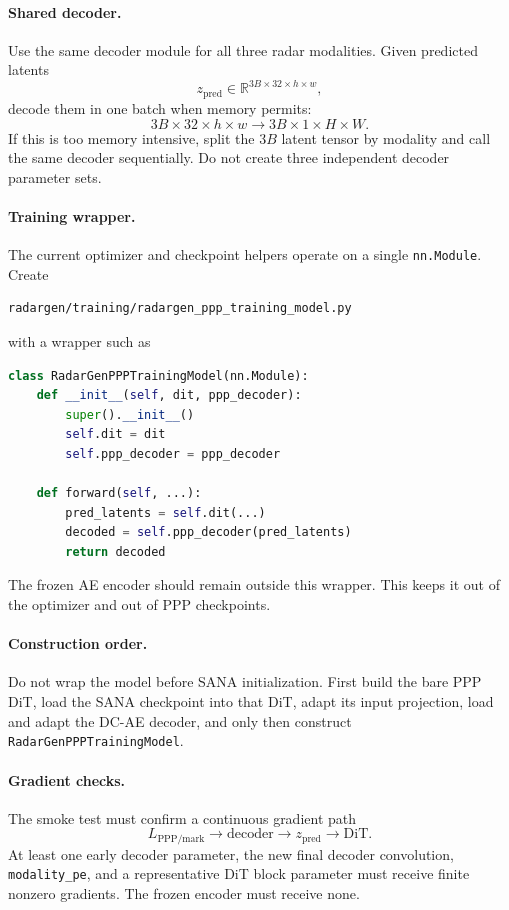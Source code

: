 \documentclass[11pt,a4paper]{article}
\begin{document}
\paragraph{Shared decoder.}
Use the same decoder module for all three radar modalities. Given predicted latents
\[
    z_{\mathrm{pred}}
    \in
    \mathbb R^{3B\times32\times h\times w},
\]
decode them in one batch when memory permits:
\[
    3B\times32\times h\times w
    \longrightarrow
    3B\times1\times H\times W.
\]
If this is too memory intensive, split the \(3B\) latent tensor by modality and call the same decoder sequentially. Do not create three independent decoder parameter sets.

\paragraph{Training wrapper.}
The current optimizer and checkpoint helpers operate on a single \texttt{nn.Module}. Create
\begin{lstlisting}
radargen/training/radargen_ppp_training_model.py
\end{lstlisting}
with a wrapper such as
\begin{lstlisting}[language=Python]
class RadarGenPPPTrainingModel(nn.Module):
    def __init__(self, dit, ppp_decoder):
        super().__init__()
        self.dit = dit
        self.ppp_decoder = ppp_decoder

    def forward(self, ...):
        pred_latents = self.dit(...)
        decoded = self.ppp_decoder(pred_latents)
        return decoded
\end{lstlisting}

The frozen AE encoder should remain outside this wrapper. This keeps it out of the optimizer and out of PPP checkpoints.

\paragraph{Construction order.}
Do not wrap the model before SANA initialization. First build the bare PPP DiT, load the SANA checkpoint into that DiT, adapt its input projection, load and adapt the DC-AE decoder, and only then construct \texttt{RadarGenPPPTrainingModel}.

\paragraph{Gradient checks.}
The smoke test must confirm a continuous gradient path
\[
    L_{\mathrm{PPP/mark}}
    \rightarrow
    \mathrm{decoder}
    \rightarrow
    z_{\mathrm{pred}}
    \rightarrow
    \mathrm{DiT}.
\]
At least one early decoder parameter, the new final decoder convolution, \texttt{modality\_pe}, and a representative DiT block parameter must receive finite nonzero gradients. The frozen encoder must receive none.
\end{document}
